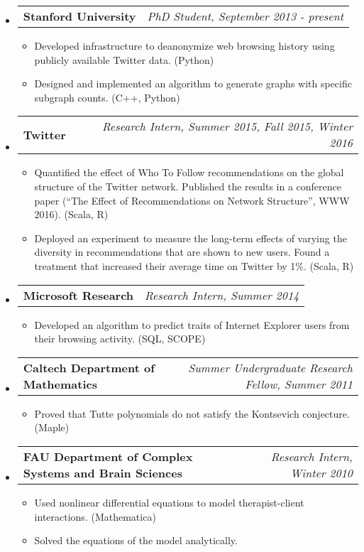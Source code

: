 \documentclass[letterpaper,10pt]{article}
\makeatletter
\newcommand{\resitem}[1]{\item #1 \vspace{-2pt}}
\newcommand{\ressubheading}[4]{
\begin{tabular*}{7.0in}{l@{\extracolsep{\fill}}r}
		\textbf{#1} & \textit{#4} \\
\end{tabular*}\vspace{-6pt}}
\makeatother
\begin{document}
\begin{itemize}
\item
	\ressubheading{Stanford University}{Stanford, CA}{PhD Student}{PhD Student, September 2013 - present}
	\begin{itemize}
	\item Developed infrastructure to deanonymize web browsing history using publicly available Twitter data.  (Python)
\item Designed and implemented an algorithm to generate graphs with specific subgraph counts.  (C++, Python)
	\end{itemize}
\item
	\ressubheading{Twitter}{San Francisco, CA}{Research Intern}{Research Intern, Summer 2015, Fall 2015, Winter 2016}
	\begin{itemize}
\item Quantified the effect of Who To Follow recommendations on the global structure of the Twitter network.  Published the results in a conference paper (``The Effect of Recommendations on Network Structure'', WWW 2016).  (Scala, R)

\item Deployed an experiment to measure the long-term effects of varying the diversity in recommendations that are shown to new users.  Found a treatment that increased their average time on Twitter by 1\%.  (Scala, R)
	\end{itemize}
\item
	\ressubheading{Microsoft Research}{Mountain View, CA}{Intern}{Research Intern, Summer 2014}
	\begin{itemize}
		\resitem{Developed an algorithm to predict traits of Internet Explorer users from their browsing activity. (SQL, SCOPE)}
	\end{itemize}
\item
	\ressubheading{Caltech Department of Mathematics}{Pasadena, CA}{Summer Undergraduate Research Fellow}{Summer Undergraduate Research Fellow, Summer 2011}
	\begin{itemize}
		\resitem{Proved that Tutte polynomials do not satisfy the Kontsevich conjecture.  (Maple)}
	\end{itemize}
\item
	\ressubheading{FAU Department of Complex Systems and Brain Sciences}{Boca Raton, FL}{Research Intern}{Research Intern, Winter 2010}
	\begin{itemize}
		\resitem{Used nonlinear differential equations to model therapist-client interactions.  (Mathematica)}
		\resitem{Solved the equations of the model analytically.}
	\end{itemize}


\end{itemize}
\end{document}

